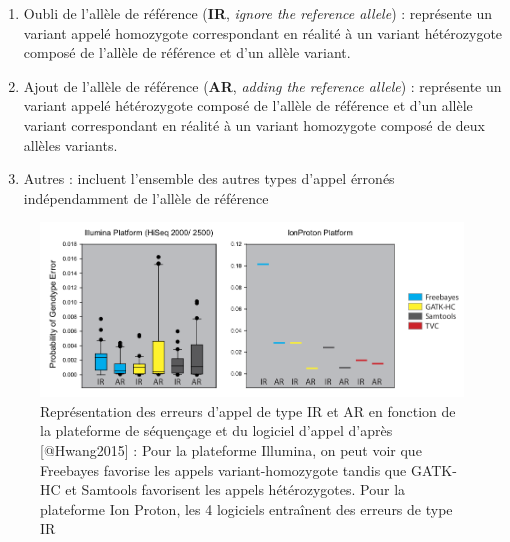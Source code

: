 \documentclass[12pt,twoside]{reedthesis}
\providecommand{\tightlist}{%
  \setlength{\itemsep}{0pt}\setlength{\parskip}{0pt}}
\theoremstyle{definition}
\theoremstyle{definition}
\theoremstyle{remark}
\begin{document}
  \begin{enumerate}
  \def\labelenumi{\arabic{enumi}.}
  \tightlist
  \item
    Oubli de l'allèle de référence (\textbf{IR}, \emph{ignore the
    reference allele}) : représente un variant appelé homozygote
    correspondant en réalité à un variant hétérozygote composé de l'allèle
    de référence et d'un allèle variant.\\
  \item
    Ajout de l'allèle de référence (\textbf{AR}, \emph{adding the
    reference allele}) : représente un variant appelé hétérozygote composé
    de l'allèle de référence et d'un allèle variant correspondant en
    réalité à un variant homozygote composé de deux allèles variants.\\
  \item
    Autres : incluent l'ensemble des autres types d'appel érronés
    indépendamment de l'allèle de référence
  \end{enumerate}
  
  \newpage
  
  \begin{figure}
  
  {\centering \includegraphics[scale=.50]{figure/snp_error_type} 
  
  }
  
  \caption[Représentation des erreurs d'appel de type IR et AR en fonction de la plateforme de séquençage et du logiciel d'appel]{Représentation des erreurs d'appel de type IR et AR en fonction de la plateforme de séquençage et du logiciel d'appel d'après [@Hwang2015] : Pour la plateforme Illumina, on peut voir que Freebayes favorise les appels variant-homozygote tandis que GATK-HC et Samtools favorisent les appels hétérozygotes. Pour la plateforme Ion Proton, les 4 logiciels entraînent des erreurs de type IR}\label{fig:snperror}
  \end{figure}
  
\end{document}
